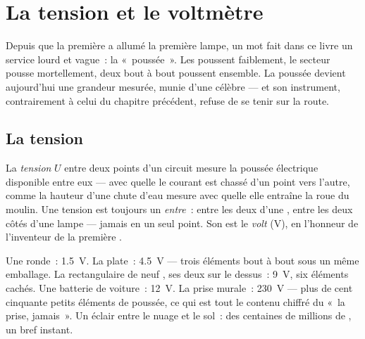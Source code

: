 \chapter{La tension et le voltmètre}\label{ch:g8:voltage-voltmeter}

Depuis que la première  a allumé la première lampe, un mot fait
dans ce livre un service lourd et vague~: la «~poussée~». Les 
poussent faiblement, le secteur pousse mortellement, deux  bout à
bout poussent ensemble. La poussée devient aujourd'hui une grandeur
mesurée, munie d'une  célèbre --- et son instrument, contrairement
à celui du chapitre précédent, refuse de se tenir sur la route.

\section{La tension}

\begin{definition}[Tension]\label{def:g8:voltage-voltmeter:voltage}
La \emph{tension} $U$ entre deux points d'un circuit
mesure la poussée électrique disponible entre eux --- avec quelle
 le courant est chassé d'un point vers l'autre, comme la hauteur
d'une chute d'eau mesure avec quelle  elle entraîne la roue du
moulin. Une tension est toujours un \emph{entre}~: entre les deux
 d'une , entre les deux côtés d'une lampe --- jamais en un
seul point. Son  est le \emph{volt} (\unit{V}), en
l'honneur de l'inventeur de la première .
\end{definition}

\begin{example}\label{ex:g8:voltage-voltmeter:values}
Une  ronde~: \qty{1.5}{V}. La  plate~: \qty{4.5}{V} --- trois
éléments bout à bout sous un même emballage. La  rectangulaire de
neuf , ses deux  sur le dessus~: \qty{9}{V}, six éléments
cachés. Une batterie de voiture~: \qty{12}{V}. La prise murale~:
\qty{230}{V} --- plus de cent cinquante petits éléments de poussée, ce
qui est tout le contenu chiffré du «~la prise, jamais~». Un éclair
entre le nuage et le sol~: des centaines de millions de , un
bref instant.
\end{example}

